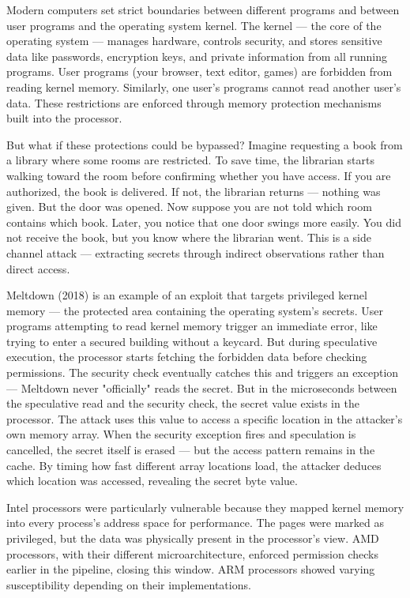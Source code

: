 Modern computers set strict boundaries between different programs and between user programs and the operating system kernel. The kernel — the core of the operating system — manages hardware, controls security, and stores sensitive data like passwords, encryption keys, and private information from all running programs. User programs (your browser, text editor, games) are forbidden from reading kernel memory. Similarly, one user's programs cannot read another user's data. These restrictions are enforced through memory protection mechanisms built into the processor.

But what if these protections could be bypassed? Imagine requesting a book from a library where some rooms are restricted. To save time, the librarian starts walking toward the room before confirming whether you have access. If you are authorized, the book is delivered. If not, the librarian returns — nothing was given. But the door was opened. Now suppose you are not told which room contains which book. Later, you notice that one door swings more easily. You did not receive the book, but you know where the librarian went. This is a side channel attack — extracting secrets through indirect observations rather than direct access.

Meltdown (2018) is an example of an exploit that targets privileged kernel memory — the protected area containing the operating system's secrets. User programs attempting to read kernel memory trigger an immediate error, like trying to enter a secured building without a keycard. But during speculative execution, the processor starts fetching the forbidden data before checking permissions. The security check eventually catches this and triggers an exception — Meltdown never "officially" reads the secret. But in the microseconds between the speculative read and the security check, the secret value exists in the processor. The attack uses this value to access a specific location in the attacker's own memory array. When the security exception fires and speculation is cancelled, the secret itself is erased — but the access pattern remains in the cache. By timing how fast different array locations load, the attacker deduces which location was accessed, revealing the secret byte value.

Intel processors were particularly vulnerable because they mapped kernel memory into every process's address space for performance. The pages were marked as privileged, but the data was physically present in the processor's view. AMD processors, with their different microarchitecture, enforced permission checks earlier in the pipeline, closing this window. ARM processors showed varying susceptibility depending on their implementations.

